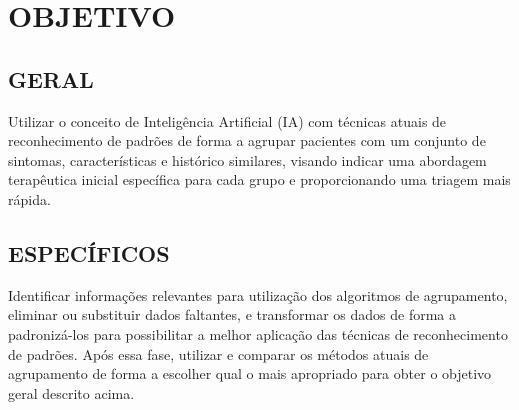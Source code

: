 \chapter{OBJETIVO}

\section{GERAL}
 
Utilizar o conceito de Inteligência Artificial (IA) com técnicas atuais de reconhecimento de padrões de forma a agrupar pacientes com um conjunto de sintomas, características e histórico similares, visando indicar uma abordagem terapêutica inicial específica para cada grupo e proporcionando uma triagem mais rápida.

\section{ESPECÍFICOS}

Identificar informações relevantes para utilização dos algoritmos de agrupamento, eliminar ou substituir dados faltantes, e transformar os dados de forma a padronizá-los para possibilitar a melhor aplicação das técnicas de reconhecimento de padrões. Após essa fase, utilizar e comparar os métodos atuais de agrupamento de forma a escolher qual o mais apropriado para obter o objetivo geral descrito acima.